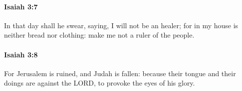		\paragraph{Isaiah 3:7} %
			\label{ISAIAH-3-7}

			In that day shall he swear, saying, I will not be an healer; for in my house is neither bread nor clothing: make me not a ruler of the people.


		\paragraph{Isaiah 3:8} %
			\label{ISAIAH-3-8}

			For Jerusalem is ruined, and Judah is fallen: because their tongue and their doings are against the LORD, to provoke the eyes of his glory.


